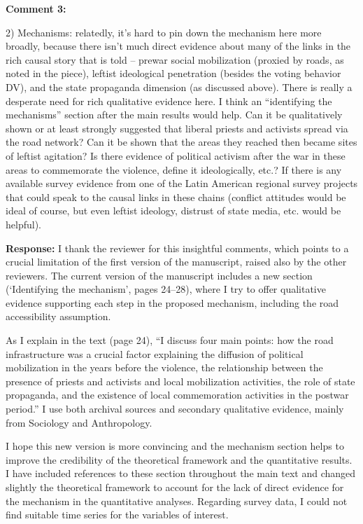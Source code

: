 \documentclass[12pt, a4paper, notitlepage]{article}
\begin{document}
\vspace{15pt}
\noindent\textbf{Comment 3:}
\begin{displayquote}
2) Mechanisms: relatedly, it’s hard to pin down the mechanism here more broadly, because there isn’t much direct evidence about many of the links in the rich causal story that is told – prewar social mobilization (proxied by roads, as noted in the piece), leftist ideological penetration (besides the voting behavior DV), and the state propaganda dimension (as discussed above). There is really a desperate need for rich qualitative evidence here. I think an “identifying the mechanisms” section after the main results would help. Can it be qualitatively shown or at least strongly suggested that liberal priests and activists spread via the road network? Can it be shown that the areas they reached then became sites of leftist agitation? Is there evidence of political activism after the war in these areas to commemorate the violence, define it ideologically, etc.? If there is any available survey evidence from one of the Latin American regional survey projects that could speak to the causal links in these chains (conflict attitudes would be ideal of course, but even leftist ideology, distrust of state media, etc. would be helpful).
\end{displayquote}

\noindent\textbf{Response:} I thank the reviewer for this insightful comments, which points to a crucial limitation of the first version of the manuscript, raised also by the other reviewers.
The current version of the manuscript includes a new section (`Identifying the mechanism', pages 24--28), where I try to offer qualitative evidence supporting each step in the proposed mechanism, including the road accessibility assumption.

As I explain in the text (page 24), ``I discuss four main points: how the road infrastructure was a crucial factor explaining the diffusion of political mobilization in the years before the violence, the relationship between the presence of priests and activists and local mobilization activities, the role of state propaganda, and the existence of local commemoration activities in the postwar period.'' I use both archival sources and secondary qualitative evidence, mainly from Sociology and Anthropology.

I hope this new version is more convincing and the mechanism section helps to improve the credibility of the theoretical framework and the quantitative results.
I have included references to these section throughout the main text and changed slightly the theoretical framework to account for the lack of direct evidence for the mechanism in the quantitative analyses.
Regarding survey data, I could not find suitable time series for the variables of interest.
\end{document}
